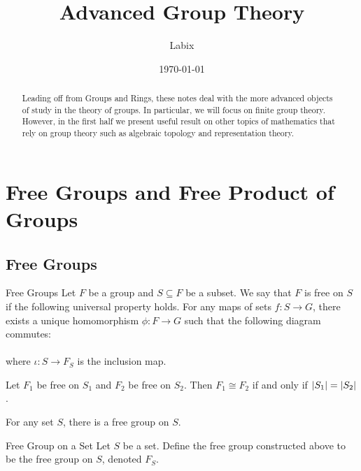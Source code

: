 \documentclass[a4paper]{article}
\title{Advanced Group Theory}
\author{Labix}
\date{\today}
\begin{document}
\maketitle
\begin{abstract}
Leading off from Groups and Rings, these notes deal with the more advanced objects of study in the theory of groups. In particular, we will focus on finite group theory. However, in the first half we present useful result on other topics of mathematics that rely on group theory such as algebraic topology and representation theory. 
\end{abstract}
\pagebreak
\tableofcontents
\pagebreak

\section{Free Groups and Free Product of Groups}
\subsection{Free Groups}
\begin{defn}{Free Groups}{} Let $F$ be a group and $S\subseteq F$ be a subset. We say that $F$ is free on $S$ if the following universal property holds. For any maps of sets $f:S\to G$, there exists a unique homomorphism $\phi:F\to G$ such that the following diagram commutes: \\~\\
where $\iota:S\to F_S$ is the inclusion map. 
\end{defn}

\begin{prp}{}{} Let $F_1$ be free on $S_1$ and $F_2$ be free on $S_2$. Then $F_1\cong F_2$ if and only if $\abs{S_1}=\abs{S_2}$. 
\end{prp}

\begin{thm}{}{} For any set $S$, there is a free group on $S$. 
\end{thm}

\begin{defn}{Free Group on a Set}{} Let $S$ be a set. Define the free group constructed above to be the free group on $S$, denoted $F_S$. 
\end{defn}
\end{document}
